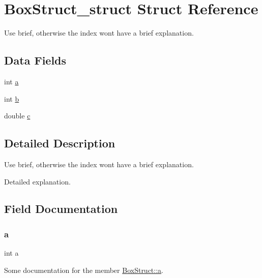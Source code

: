 \hypertarget{struct_box_struct__struct}{}\section{Box\+Struct\+\_\+struct Struct Reference}
\label{struct_box_struct__struct}


Use brief, otherwise the index won\textquotesingle{}t have a brief explanation.  


\subsection*{Data Fields}
\begin{DoxyCompactItemize}
\item 
int \mbox{\hyperlink{struct_box_struct__struct_aa4c2a5552e9bc49b1816ff532f558c74}{a}}
\item 
int \mbox{\hyperlink{struct_box_struct__struct_a148e3876077787926724625411d6e7a9}{b}}
\item 
double \mbox{\hyperlink{struct_box_struct__struct_a2c09e929a6ea340fc9653cca414b11d3}{c}}
\end{DoxyCompactItemize}


\subsection{Detailed Description}
Use brief, otherwise the index won\textquotesingle{}t have a brief explanation. 

Detailed explanation. 

\subsection{Field Documentation}
\mbox{\label{struct_box_struct__struct_aa4c2a5552e9bc49b1816ff532f558c74}} 
\subsubsection{\texorpdfstring{a}{a}}
{\footnotesize\ttfamily int a}

Some documentation for the member \mbox{\hyperlink{struct_box_struct__struct_aa4c2a5552e9bc49b1816ff532f558c74}{Box\+Struct\+::a}}. \mbox{\label{struct_box_struct__struct_a148e3876077787926724625411d6e7a9}} 
